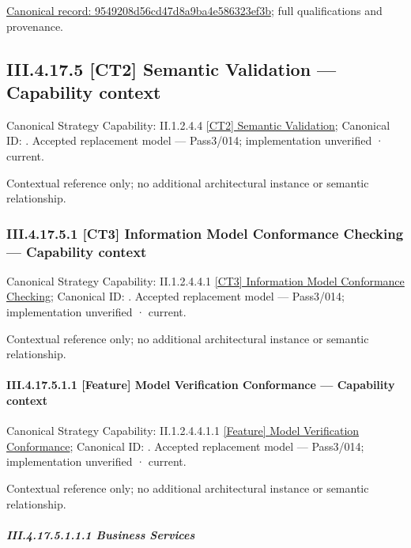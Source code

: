 {\footnotesize \href{../../../../continuum/business/business-function/9549208d56cd47d8a9ba4e586323ef3b.md}{Canonical record: 9549208d56cd47d8a9ba4e586323ef3b}; full qualifications and provenance.}\par
\subsection*{III.4.17.5 [CT2] Semantic Validation — Capability context}
\label{navigation:III.4.17.5}

{\small Canonical Strategy Capability: II.1.2.4.4 \hyperref[element:5dfb80f15eff4ec8bbb60016d36a5cd1]{[CT2] Semantic Validation}; Canonical ID: \texttt{}. Accepted replacement model — Pass3/014; implementation unverified · current.}\par
Contextual reference only; no additional architectural instance or semantic relationship.\par
\subsubsection*{III.4.17.5.1 [CT3] Information Model Conformance Checking — Capability context}
\label{navigation:III.4.17.5.1}

{\small Canonical Strategy Capability: II.1.2.4.4.1 \hyperref[element:a3a6683b5a48418ca51c94784fc24bee]{[CT3] Information Model Conformance Checking}; Canonical ID: \texttt{}. Accepted replacement model — Pass3/014; implementation unverified · current.}\par
Contextual reference only; no additional architectural instance or semantic relationship.\par
\paragraph*{III.4.17.5.1.1 [Feature] Model Verification Conformance — Capability context}
\label{navigation:III.4.17.5.1.1}

{\small Canonical Strategy Capability: II.1.2.4.4.1.1 \hyperref[element:89e8a277738845cbb768e8685e8e2d56]{[Feature] Model Verification Conformance}; Canonical ID: \texttt{}. Accepted replacement model — Pass3/014; implementation unverified · current.}\par
Contextual reference only; no additional architectural instance or semantic relationship.\par
\subparagraph*{III.4.17.5.1.1.1 Business Services}
\label{navigation:III.4.17.5.1.1.1}

